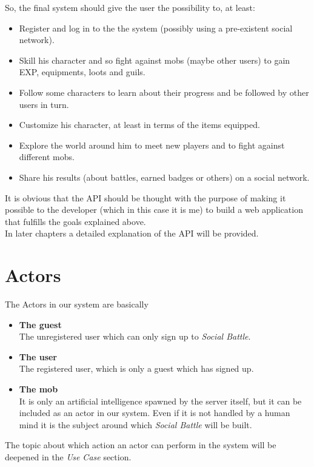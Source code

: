 	\noindent So, the final system should give the user the possibility to, at least:
	\newcommand{\goalSignup}{Register and log in to the the system (possibly using a pre-existent social network).}
	\newcommand{\goalSkill}{Skill his character and so fight against mobs (maybe other users) to gain
			EXP, equipments, loots and guils.}
	\newcommand{\goalFollow}{Follow some characters to learn about their progress and be followed by other users in turn.}
	\newcommand{\goalProfile}{Customize his character, at least in terms of the items equipped.}
	\newcommand{\goalExplore}{Explore the world around him to meet new players and to fight against different mobs.}
	\newcommand{\goalShare}{Share his results (about battles, earned badges or others) on a social network.}
	\begin{itemize}
		\item \goalSignup
		\item \goalSkill
		\item \goalFollow
		\item \goalProfile
		\item \goalExplore
		\item \goalShare
	\end{itemize}

	\noindent It is obvious that the API should be thought with the purpose of making it possible to the developer 
	(which in this case it is me) to build a web application that fulfills the goals explained above.\\
	In later chapters a detailed explanation of the API will be provided.

	\section{Actors}
	The Actors in our system are basically
	\begin{itemize}
		\item \textbf{The guest}\\
		The unregistered user which can only sign up to \textit{Social Battle}.
		\item \textbf{The user}\\
		The registered user, which is only a guest which has signed up.
		\item \textbf{The mob}\\
		It is only an artificial intelligence spawned by the server itself, but it can be included as an actor in 
		our system. Even if it is not handled by a human mind it is the subject around which \textit{Social Battle} 
		will be built.
	\end{itemize}
	The topic about which action an actor can perform in the system will be deepened in the \textit{Use Case} section.